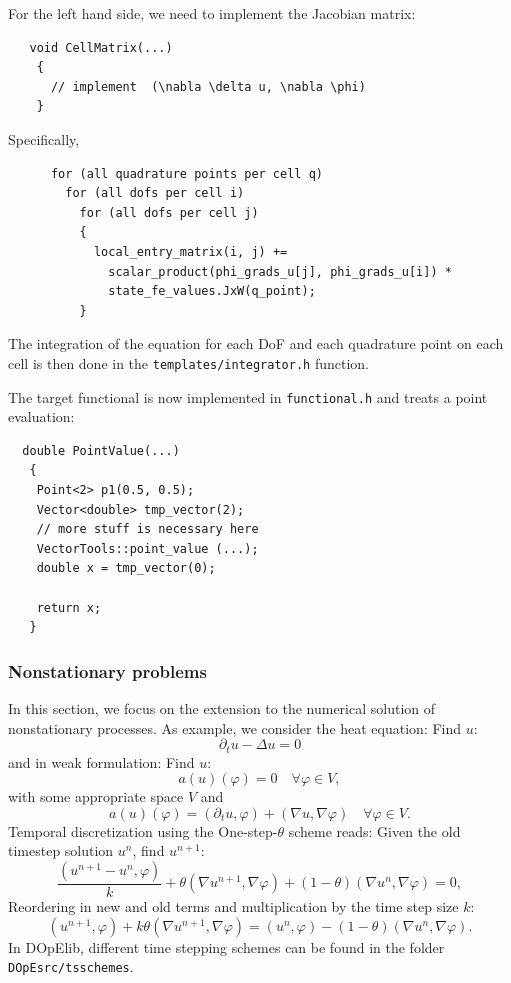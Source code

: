 \documentclass[prodmode,acmtoms]{acmsmall}
\numberwithin{equation}{section}
\renewcommand{\phi}{\varphi}
\begin{document}
For the left hand side, we need to implement the Jacobian matrix:
\begin{lstlisting}
   void CellMatrix(...)
    {
      // implement  (\nabla \delta u, \nabla \phi)
    }
\end{lstlisting}
Specifically,
\begin{lstlisting}
      for (all quadrature points per cell q)      
        for (all dofs per cell i)    
          for (all dofs per cell j)
          {
            local_entry_matrix(i, j) += 
              scalar_product(phi_grads_u[j], phi_grads_u[i]) * 
              state_fe_values.JxW(q_point);
          }
\end{lstlisting}
The integration of the equation for each DoF and each quadrature point on each
cell is then done 
in the \texttt{templates/integrator.h} function. 


The target functional 
is now implemented in \texttt{functional.h} and 
treats a point evaluation:
\begin{lstlisting}
  double PointValue(...)
   {
    Point<2> p1(0.5, 0.5);
    Vector<double> tmp_vector(2);
    // more stuff is necessary here
    VectorTools::point_value (...);
    double x = tmp_vector(0);

    return x;
   }
\end{lstlisting}




\subsubsection{Nonstationary problems}
In this section, we focus on the extension to 
the numerical solution of nonstationary processes. 
As example, we consider the heat equation:
Find $u$:
\[
\partial_t u - \Delta u = 0
\]
and in weak formulation:
Find $u$:
\[
a(u)(\phi) = 0 \quad \forall \phi \in V,
\]
with some appropriate space $V$ and 
\[
a(u)(\phi) = (\partial_t u, \phi) + (\nabla u, \nabla \phi) \quad \forall \phi \in V.
\]
Temporal discretization using the One-step-$\theta$ scheme reads:
Given the old timestep solution $u^n$, find $u^{n+1}$:
\[
\frac{(u^{n+1} - u^{n}, \phi)}{k} + \theta (\nabla u^{n+1}, \nabla \phi)
+ (1 - \theta) (\nabla u^{n}, \nabla \phi) = 0,
\]
Reordering in new and old terms and multiplication by the time step size $k$:
\[
(u^{n+1},\phi) + k \theta (\nabla u^{n+1}, \nabla \phi)
= (u^n, \phi) - (1 - \theta) (\nabla u^{n}, \nabla \phi).
\]
In DOpElib, different time stepping schemes can be found 
in the folder \texttt{DOpEsrc/tsschemes}.
\end{document}
